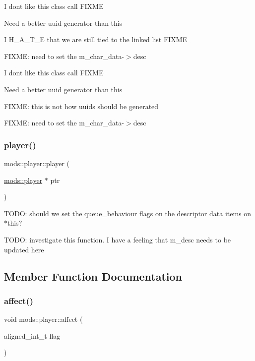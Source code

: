 I don\textquotesingle{}t like this class call F\+I\+X\+ME

Need a better uuid generator than this

I H\+\_\+\+A\+\_\+\+T\+\_\+E that we are still tied to the linked list F\+I\+X\+ME

F\+I\+X\+ME\+: need to set the m\+\_\+char\+\_\+data-\/$>$desc

I don\textquotesingle{}t like this class call F\+I\+X\+ME

Need a better uuid generator than this

F\+I\+X\+ME\+: this is not how uuid\textquotesingle{}s should be generated

F\+I\+X\+ME\+: need to set the m\+\_\+char\+\_\+data-\/$>$desc \mbox{\label{classmods_1_1player_abab6e7c067da6cac1c9e8bd2debbca7a}} 
\subsubsection{\texorpdfstring{player()}{player()}\hspace{0.1cm}{\footnotesize\ttfamily [2/2]}}
{\footnotesize\ttfamily mods\+::player\+::player (\begin{DoxyParamCaption}\item[{\hyperlink{classmods_1_1player}{mods\+::player} $\ast$}]{ptr }\end{DoxyParamCaption})}

T\+O\+DO\+: should we set the queue\+\_\+behaviour flags on the descriptor data items on $\ast$this?

T\+O\+DO\+: investigate this function. I have a feeling that m\+\_\+desc needs to be updated here 

\subsection{Member Function Documentation}
\mbox{\label{classmods_1_1player_a5af5ab2621df94bc867bc56ab37b0099}} 
\subsubsection{\texorpdfstring{affect()}{affect()}\hspace{0.1cm}{\footnotesize\ttfamily [1/2]}}
{\footnotesize\ttfamily void mods\+::player\+::affect (\begin{DoxyParamCaption}\item[{aligned\+\_\+int\+\_\+t}]{flag }\end{DoxyParamCaption})}

